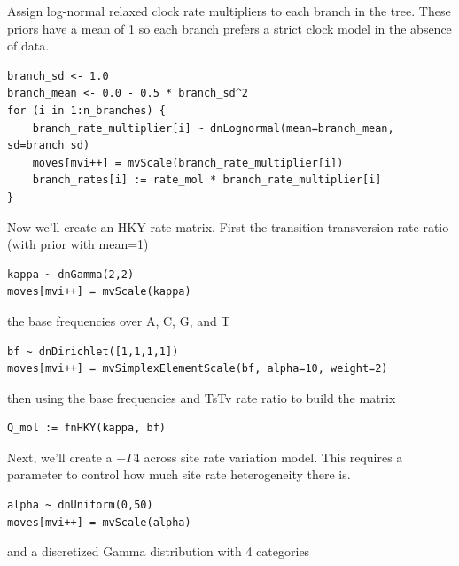 Assign log-normal relaxed clock rate multipliers to each branch in the tree. These priors have a mean of 1 so each branch prefers a strict clock model in the absence of data.
\begin{snugshade}
\begin{lstlisting}
branch_sd <- 1.0
branch_mean <- 0.0 - 0.5 * branch_sd^2
for (i in 1:n_branches) {
    branch_rate_multiplier[i] ~ dnLognormal(mean=branch_mean, sd=branch_sd)
    moves[mvi++] = mvScale(branch_rate_multiplier[i])
    branch_rates[i] := rate_mol * branch_rate_multiplier[i]
}
\end{lstlisting}
\end{snugshade}

Now we'll create an HKY rate matrix. First the transition-transversion rate ratio (with prior with mean=1)

\begin{snugshade}
\begin{lstlisting}
kappa ~ dnGamma(2,2)
moves[mvi++] = mvScale(kappa)
\end{lstlisting}
\end{snugshade}

the base frequencies over A, C, G, and T

\begin{snugshade}
\begin{lstlisting}
bf ~ dnDirichlet([1,1,1,1])
moves[mvi++] = mvSimplexElementScale(bf, alpha=10, weight=2)
\end{lstlisting}
\end{snugshade}

then using the base frequencies and TsTv rate ratio to build the matrix

\begin{snugshade}
\begin{lstlisting}
Q_mol := fnHKY(kappa, bf)
\end{lstlisting}
\end{snugshade}

Next, we'll create a $+\Gamma4$ across site rate variation model.
This requires a parameter to control how much site rate heterogeneity there is.

\begin{snugshade}
\begin{lstlisting}
alpha ~ dnUniform(0,50)
moves[mvi++] = mvScale(alpha)
\end{lstlisting}
\end{snugshade}

and a discretized Gamma distribution with 4 categories

